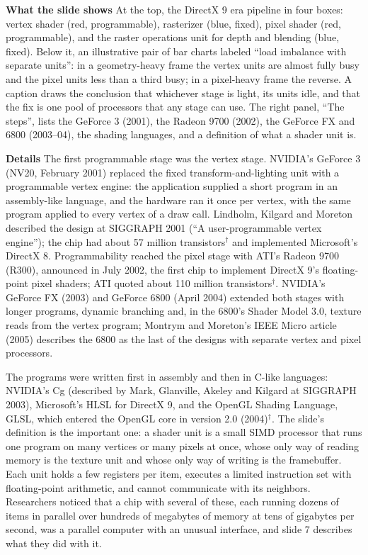\documentclass[11pt,letterpaper]{article}
\newcommand{\para}[1]{\medskip\noindent\textbf{#1}\quad}
\begin{document}
\para{What the slide shows} At the top, the DirectX 9 era pipeline in four boxes: vertex shader (red, programmable), rasterizer (blue, fixed), pixel shader (red, programmable), and the raster operations unit for depth and blending (blue, fixed). Below it, an illustrative pair of bar charts labeled ``load imbalance with separate units'': in a geometry-heavy frame the vertex units are almost fully busy and the pixel units less than a third busy; in a pixel-heavy frame the reverse. A caption draws the conclusion that whichever stage is light, its units idle, and that the fix is one pool of processors that any stage can use. The right panel, ``The steps'', lists the GeForce 3 (2001), the Radeon 9700 (2002), the GeForce FX and 6800 (2003--04), the shading languages, and a definition of what a shader unit is.

\para{Details} The first programmable stage was the vertex stage. NVIDIA's GeForce 3 (NV20, February 2001) replaced the fixed transform-and-lighting unit with a programmable vertex engine: the application supplied a short program in an assembly-like language, and the hardware ran it once per vertex, with the same program applied to every vertex of a draw call. Lindholm, Kilgard and Moreton described the design at SIGGRAPH 2001 (``A user-programmable vertex engine''); the chip had about 57 million transistors$^\dagger$ and implemented Microsoft's DirectX 8. Programmability reached the pixel stage with ATI's Radeon 9700 (R300), announced in July 2002, the first chip to implement DirectX 9's floating-point pixel shaders; ATI quoted about 110 million transistors$^\dagger$. NVIDIA's GeForce FX (2003) and GeForce 6800 (April 2004) extended both stages with longer programs, dynamic branching and, in the 6800's Shader Model 3.0, texture reads from the vertex program; Montrym and Moreton's IEEE Micro article (2005) describes the 6800 as the last of the designs with separate vertex and pixel processors.

The programs were written first in assembly and then in C-like languages: NVIDIA's Cg (described by Mark, Glanville, Akeley and Kilgard at SIGGRAPH 2003), Microsoft's HLSL for DirectX 9, and the OpenGL Shading Language, GLSL, which entered the OpenGL core in version 2.0 (2004)$^\dagger$. The slide's definition is the important one: a shader unit is a small SIMD processor that runs one program on many vertices or many pixels at once, whose only way of reading memory is the texture unit and whose only way of writing is the framebuffer. Each unit holds a few registers per item, executes a limited instruction set with floating-point arithmetic, and cannot communicate with its neighbors. Researchers noticed that a chip with several of these, each running dozens of items in parallel over hundreds of megabytes of memory at tens of gigabytes per second, was a parallel computer with an unusual interface, and slide 7 describes what they did with it.
\end{document}
